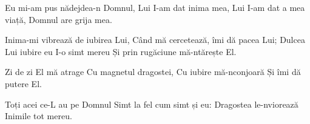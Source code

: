\beginverse
Eu mi-am pus nădejdea-n Domnul,
Lui I-am dat inima mea,
Lui I-am dat a mea viață,
Domnul are grija mea.
\endverse

\beginchorus
Inima-mi vibrează de iubirea Lui,
Când mă cercetează, îmi dă pacea Lui;
Dulcea Lui iubire eu I-o simt mereu
Și prin rugăciune mă-ntărește El.
\endchorus

\beginverse
Zi de zi El mă atrage
Cu magnetul dragostei,
Cu iubire mă-nconjoară
Și îmi dă putere El.
\endverse

\beginverse
Toți acei ce-L au pe Domnul
Simt la fel cum simt și eu:
Dragostea le-nviorează
Inimile tot mereu.
\endverse
\endsong